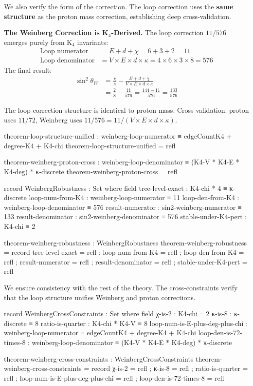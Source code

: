 \documentclass[11pt,a4paper]{book}
\begin{document}
We also verify the form of the correction. The loop correction uses the \textbf{same structure} as the proton mass correction, establishing deep cross-validation.

\textbf{The Weinberg Correction is K$_4$-Derived.} The loop correction $11/576$ emerges purely from K$_4$ invariants:
\begin{align*}
\text{Loop numerator} &= E + d + \chi = 6 + 3 + 2 = 11 \\
\text{Loop denominator} &= V \times E \times d \times \kappa = 4 \times 6 \times 3 \times 8 = 576
\end{align*}
The final result:
\begin{align*}
\sin^2\theta_W &= \frac{\chi}{\kappa} - \frac{E + d + \chi}{V \times E \times d \times \kappa} \\
               &= \frac{2}{8} - \frac{11}{576} = \frac{144 - 11}{576} = \frac{133}{576}
\end{align*}

The loop correction structure is identical to proton mass.
Cross-validation: proton uses $11/72$, Weinberg uses $11/576 = 11/(V \times E \times d \times \kappa)$.

\begin{code}
theorem-loop-structure-unified : weinberg-loop-numerator ≡ edgeCountK4 + degree-K4 + K4-chi
theorem-loop-structure-unified = refl

theorem-weinberg-proton-cross : weinberg-loop-denominator ≡ (K4-V * K4-E * K4-deg) * κ-discrete
theorem-weinberg-proton-cross = refl

record WeinbergRobustness : Set where
  field
    tree-level-exact         : K4-chi * 4 ≡ κ-discrete
    loop-num-from-K4         : weinberg-loop-numerator ≡ 11
    loop-den-from-K4         : weinberg-loop-denominator ≡ 576
    result-numerator         : sin2-weinberg-numerator ≡ 133
    result-denominator       : sin2-weinberg-denominator ≡ 576
    stable-under-K4-pert     : K4-chi ≡ 2

theorem-weinberg-robustness : WeinbergRobustness
theorem-weinberg-robustness = record
  { tree-level-exact = refl
  ; loop-num-from-K4 = refl
  ; loop-den-from-K4 = refl
  ; result-numerator = refl
  ; result-denominator = refl
  ; stable-under-K4-pert = refl
  }
\end{code}

We ensure consistency with the rest of the theory. The cross-constraints verify that the loop structure unifies Weinberg and proton corrections.

\begin{code}
record WeinbergCrossConstraints : Set where
  field
    χ-is-2 : K4-chi ≡ 2
    κ-is-8 : κ-discrete ≡ 8
    ratio-is-quarter : K4-chi * K4-V ≡ 8
    loop-num-is-E-plus-deg-plus-chi : weinberg-loop-numerator ≡ edgeCountK4 + degree-K4 + K4-chi
    loop-den-is-72-times-8 : weinberg-loop-denominator ≡ (K4-V * K4-E * K4-deg) * κ-discrete

theorem-weinberg-cross-constraints : WeinbergCrossConstraints
theorem-weinberg-cross-constraints = record
  { χ-is-2 = refl
  ; κ-is-8 = refl
  ; ratio-is-quarter = refl
  ; loop-num-is-E-plus-deg-plus-chi = refl
  ; loop-den-is-72-times-8 = refl
  }
\end{code}
\end{document}
